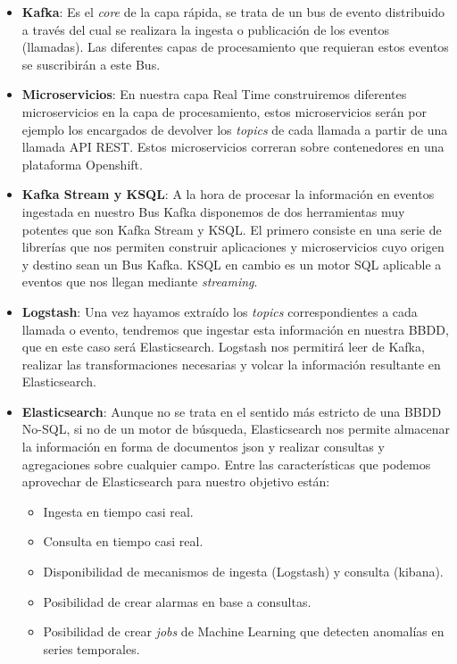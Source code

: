 \begin{itemize}
	\item \textbf{Kafka}: Es el \textit{core} de la capa rápida, se trata de un bus de evento distribuido a través del cual se realizara la ingesta o publicación de los eventos (llamadas). Las diferentes capas de procesamiento que requieran estos eventos se suscribirán a este Bus.
	\item \textbf{Microservicios}: En nuestra capa Real Time construiremos diferentes microservicios en la capa de procesamiento, estos microservicios serán por ejemplo los encargados de devolver los \textit{topics} de cada llamada a partir de una llamada API REST. Estos microservicios correran sobre contenedores en una plataforma Openshift. 
	\item\textbf{ Kafka Stream y KSQL}: A la hora de procesar la información en eventos ingestada en nuestro Bus Kafka disponemos de dos herramientas muy potentes que son Kafka Stream y KSQL. El primero consiste en una serie de librerías que nos permiten construir aplicaciones y microservicios cuyo origen y destino sean un Bus Kafka. KSQL en cambio es un motor SQL aplicable a eventos que nos llegan mediante \textit{streaming}.
	\item \textbf{Logstash}: Una vez hayamos extraído los \textit{topics} correspondientes a cada llamada o evento, tendremos que ingestar esta información en nuestra BBDD, que en este caso será Elasticsearch. Logstash nos permitirá leer de Kafka, realizar las transformaciones necesarias y volcar la información resultante en Elasticsearch.
	\item \textbf{Elasticsearch}: Aunque no se trata en el sentido más estricto de una BBDD No-SQL, si no de un motor de búsqueda, Elasticsearch nos permite almacenar la información en forma de documentos json y realizar consultas y agregaciones sobre cualquier campo. Entre las características que podemos aprovechar de Elasticsearch para nuestro objetivo están: 
	\begin{itemize}
		\item Ingesta en tiempo casi real.
		\item Consulta en tiempo casi real. 
		\item Disponibilidad de mecanismos de ingesta (Logstash) y consulta (kibana).
		\item Posibilidad de crear alarmas en base a consultas. 
		\item Posibilidad de crear \textit{jobs} de Machine Learning que detecten anomalías en series temporales. 
	\end{itemize}
	
	
\end{itemize}

